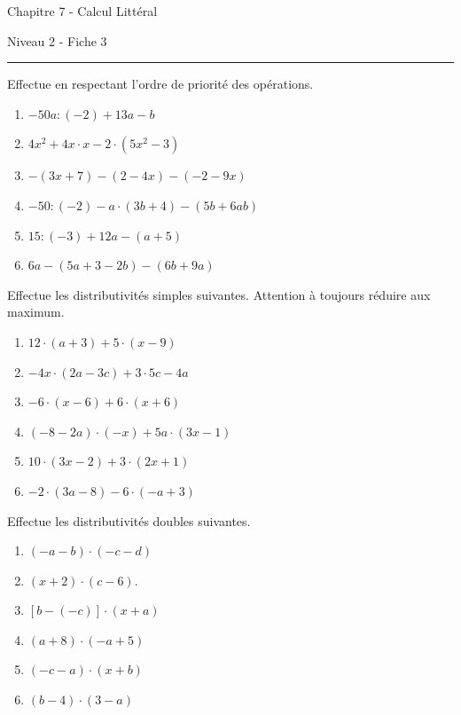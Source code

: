 \documentclass[12pt,parskip=half-, twoside=semi]{scrartcl}
\begin{document}
\begin{center}
  \bfseries
  \begin{Huge}
    Chapitre 7 - Calcul Littéral
  \end{Huge}
  \smallbreak
  \begin{large}
    Niveau 2  - Fiche 3
  \end{large}
  \smallbreak
  \rule[10pt]{.5\linewidth}{1 pt}
\end{center}

\setcounter{exercise}{0}

\begin{exercise}Effectue en respectant l'ordre de priorité des opérations.
  \begin{enumerate}[cols=2]
    \item $-50 a:(-2)+13 a-b$
    \item $4 x^2+4 x \cdot x-2 \cdot\left(5 x^2-3\right)$
    \item $-(3 x+7)-(2-4 x)-(-2-9 x)$
    \item $-50:(-2)-a \cdot(3 b+4)-(5 b+6 a b)$
    \item $15:(-3)+12 a-(a+5)$
    \item $6 a-(5 a+3-2 b)-(6 b+9 a)$
  \end{enumerate}
\end{exercise}
 
\begin{exercise}Effectue les distributivités simples suivantes. Attention à toujours réduire aux maximum.
  \begin{enumerate}[cols=2]
    \item $12 \cdot(a+3)+5 \cdot(x-9)$
    \item $-4 x \cdot(2 a-3 c)+3 \cdot 5 c-4 a$
    \item $-6 \cdot(x-6)+6 \cdot(x+6)$
    \item $(-8-2 a) \cdot(-x)+5 a \cdot(3 x-1)$
    \item $10 \cdot(3 x-2)+3 \cdot(2 x+1)$
    \item $-2 \cdot(3 a-8)-6 \cdot(-a+3)$
  \end{enumerate}
\end{exercise}


\begin{exercise}Effectue les distributivités doubles suivantes.
  \begin{enumerate}[cols=3]
    \item $(-a-b) \cdot(-c-d)$
    \item $(x+2) \cdot(c-6)$.
    \item $[b-(-c)] \cdot(x+a)$
    \item $(a+8) \cdot(-a+5)$
    \item $(-c-a) \cdot(x+b)$
    \item $(b-4) \cdot(3-a)$
  \end{enumerate}
\end{exercise}
\end{document}
